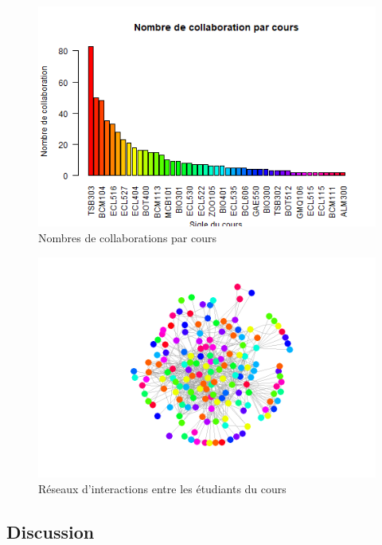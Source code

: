 \documentclass[9pt,twocolumn,twoside,]{pnas-new}
\begin{document}
\begin{figure}
  \centering
  \includegraphics[width=\linewidth]{sigle3.png}
  \caption{Nombres de collaborations par cours}
  \label{fig:sigle3}
\end{figure}

\begin{figure}
  \centering
  \includegraphics[width=\linewidth]{matrice.png}
  \caption{Réseaux d'interactions entre les étudiants du cours}
  \label{fig:matrice}
\end{figure}


\hypertarget{Discussion}{%
\subsection*{Discussion}\label{Discussion}}
\end{document}
